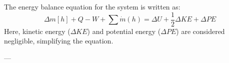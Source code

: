 The energy balance equation for the system is written as:  
\[
\Delta m \left[ h \right] + Q - W + \sum \dot{m} \left( h \right) = \Delta U + \frac{1}{2} \Delta KE + \Delta PE
\]  
Here, kinetic energy (\( \Delta KE \)) and potential energy (\( \Delta PE \)) are considered negligible, simplifying the equation.

---